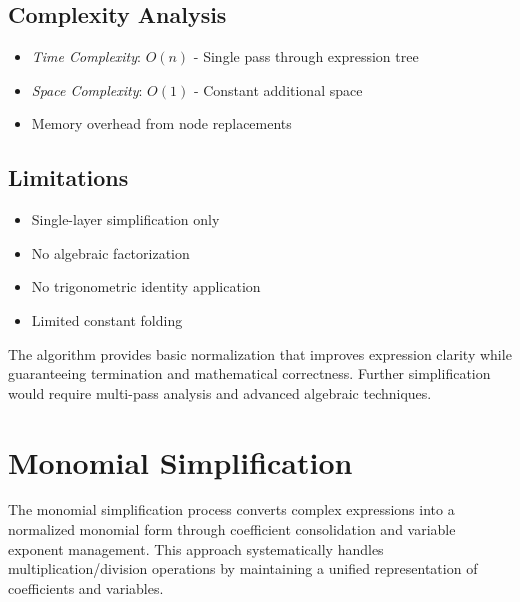 \documentclass{report}
\begin{document}
\subsection*{Complexity Analysis}

\begin{itemize}
    \item \textit{Time Complexity}: $O(n)$ - Single pass through expression tree
    \item \textit{Space Complexity}: $O(1)$ - Constant additional space
    \item Memory overhead from node replacements
\end{itemize}

\subsection*{Limitations}
\begin{itemize}
    \item Single-layer simplification only
    \item No algebraic factorization
    \item No trigonometric identity application
    \item Limited constant folding
\end{itemize}

The algorithm provides basic normalization that improves expression clarity while guaranteeing termination and mathematical correctness. Further simplification would require multi-pass analysis and advanced algebraic techniques.



\section*{Monomial Simplification}

The monomial simplification process converts complex expressions into a normalized monomial form through coefficient consolidation and variable exponent management. This approach systematically handles multiplication/division operations by maintaining a unified representation of coefficients and variables.
\end{document}
